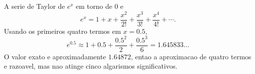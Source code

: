 A serie de Taylor de $e^x$ em torno de $0$ e
\[
e^x = 1 + x + \frac{x^2}{2!} + \frac{x^3}{3!} + \frac{x^4}{4!} + \cdots.
\]
Usando os primeiros quatro termos em $x=0.5$,
\[
e^{0.5} \approx 1 + 0.5 + \frac{0.5^2}{2} + \frac{0.5^3}{6}
= 1.645833\ldots
\]
O valor exato e aproximadamente $1.64872$, entao a aproximacao de quatro termos e razoavel, mas nao atinge cinco algarismos significativos.


